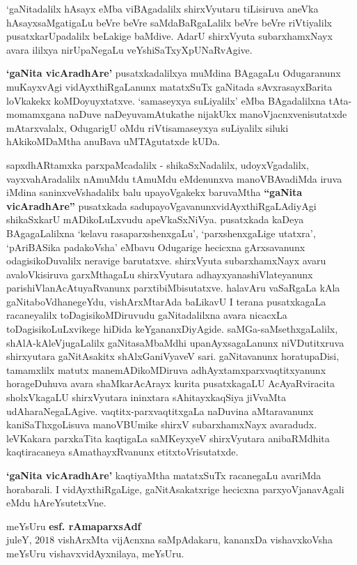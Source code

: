 \bigskip

`gaNitadalilx hAsayx eMba viBAgadalilx shirxVyutaru tiLisiruva aneVka hAsayx\-saMgatigaLu beVre beVre saMdaBaRgaLalilx beVre beVre riVtiyalilx pusatxkarUpadalilx beLakige baMdive. AdarU shirxVyuta subarxhamxNayx avara ililxya nirUpaNegaLu veYshiSaTxyXpUNaRvAgive.

\bigskip

{\bf `gaNita vicAradhAre'} pusatxkadalilxya muMdina BAgagaLu Odugaranunx muKayx\-vAgi vidAyxthiRgaLanunx matatxSuTx gaNitada sAvxrasayxBarita loVkakekx koMDoyuyxtatxve. `samaseyxya suLiyalilx' eMba BAgadalilxna tAta-momamxgana naDuve naDeyuva\break mAtukathe nijakUkx manoVjacnxvenisutatxde mAtarxvalalx, OdugarigU oMdu riVti\break samaseyxya suLiyalilx siluki hAkikoMDaMtha anuBava uMTAgutatxde kUDa.

\bigskip

sapxdhARtamxka parxpaMcadalilx - shikaSxNadalilx, udoyxVgadalilx, vayxvahAradalilx nAmuMdu tAmuMdu eMdenunxva manoVBAvadiMda iruva iMdina saninxveVshadalilx balu upayoVgakekx baruvaMtha {\bf ``gaNita vicAradhAre''} pusatxkada sadupayoVgavanunx\break vidAyxthiRgaLAdiyAgi shikaSxkarU mADikoLuLxvudu apeVkaSxNiVya. pusatxkada kaDeya BAgagaLalilxna `kelavu rasaparxshenxgaLu', `parxshenxgaLige utatxra', `pAriBASika padakoVsha' eMbavu Odugarige hecicxna gArxsavanunx odagisikoDuvalilx neravige barutatxve. shirxVyuta subarxhamxNayx avaru avaloVkisiruva garxMthagaLu shirxVyutara adhayxyanashiVlateyanunx parishiVlanAcAtuyaRvanunx parxtibiMbisutatxve. halavAru vaSaRgaLa kAla gaNita\-boVdhanegeYdu, vishArxMtarAda baLikavU I terana pusatxkagaLa racaneyalilx toDagisi\-koMDiruvudu gaNitadalilxna avara nicacxLa toDagisikoLuLxvikege hiDida keYgananxDi\break yAgide. saMGa-saMsethxgaLalilx, shAlA-kAleVjugaLalilx gaNitasaMbaMdhi upanAyxsa\break gaLanunx niVDutitxruva shirxyutara gaNitAsakitx shAlxGaniVyaveV sari. gaNitavanunx horatu\-paDisi, tamamxlilx matutx manemADikoMDiruva adhAyxtamxparxvaqtitxyanunx horageDuhuva avara shaMkarAcArayx kurita pusatxkagaLU AcAyaRviracita sholxVkagaLU shirxVyutara ininxtara sAhitayxkaqSiya jiVvaMta udAharaNegaLAgive. vaqtitx-parxvaqtitxgaLa naDuvina aMtaravanunx kaniSaThxgoLisuva manoVBUmike shirxV subarxhamxNayx avaradudx. leVKakara parxkaTita kaqtigaLa saMKeyxyeV shirxVyutara anibaRMdhita kaqtiracaneya sAmathayxRvanunx etitxtoVrisutatxde.

\bigskip

{\bf `gaNita vicAradhAre'} kaqtiyaMtha matatxSuTx racanegaLu avariMda horabarali. I vidAyxthiRgaLige, gaNitAsakatxrige hecicxna parxyoVjanavAgali eMdu hAreYsutetxVne.

\bigskip

\begin{flushright}
meYsUru \hfill{\bf esf. rAmaparxsAdf}\hfill\\
juleY, $2018$ \hfill{vishArxMta vijAcnxna saMpAdakaru, kananxDa vishavxkoVsha}\\
\hfill{meYsUru vishavxvidAyxnilaya, meYsUru.}\\
\end{flushright}
